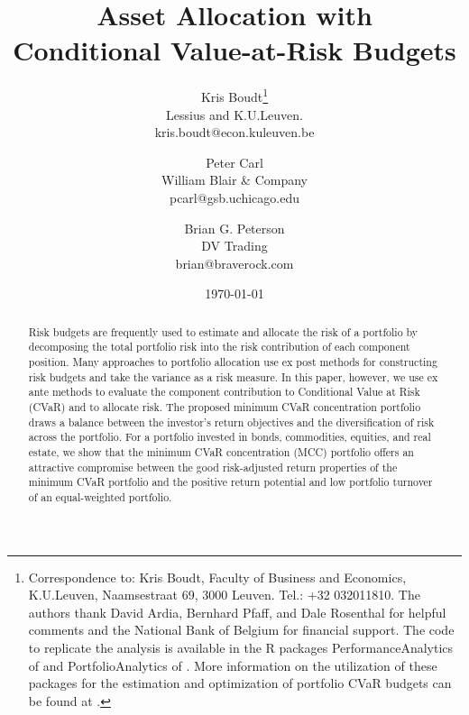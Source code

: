 \documentclass[12pt,a4paper]{article}
\renewcommand{\baselinestretch}{1.3}
\begin{document}
\vspace{-2cm}
\renewcommand{\baselinestretch}{1}
\title{Asset Allocation with \\ Conditional Value-at-Risk Budgets}

\smallskip

\author{
Kris Boudt\thanks{Correspondence to: Kris Boudt,
Faculty of Business and Economics, K.U.Leuven, Naamsestraat 69, 3000 Leuven. Tel.: +32 032011810. The authors thank David Ardia, Bernhard Pfaff, and Dale Rosenthal for helpful comments and the National Bank of Belgium for financial support. The code to replicate the analysis is available in the R packages PerformanceAnalytics of \citet{PerformanceAnalytics} and PortfolioAnalytics of \citet{PortfolioAnalytics}. More information on the utilization of these packages for the estimation and optimization of portfolio CVaR budgets can be found at \web.}\\
Lessius and K.U.Leuven.\\
kris.boudt@econ.kuleuven.be
 \and Peter Carl\\
William Blair \& Company  \\
pcarl@gsb.uchicago.edu\\
\and Brian G. Peterson\\
DV Trading\\
brian@braverock.com}

\date{\today}

\maketitle
\thispagestyle{empty} %

\vspace{-0.5cm}

\renewcommand{\baselinestretch}{1}
\begin{abstract}
Risk budgets are frequently used to estimate and allocate the risk of a portfolio by decomposing the total portfolio risk into the risk contribution of each component position. Many approaches to portfolio allocation use ex post methods for constructing risk budgets and take the variance as a risk measure. In this paper, however, we use ex ante methods to evaluate the component contribution to Conditional Value at Risk (CVaR) and to allocate risk. The proposed minimum CVaR concentration portfolio draws a balance between the investor's return objectives and the diversification of risk across the portfolio. For a portfolio invested in bonds, commodities, equities, and real estate, we show that the minimum CVaR concentration (MCC) portfolio offers an attractive compromise between the good risk-adjusted return properties of the minimum CVaR portfolio and the positive return potential and low portfolio turnover of an equal-weighted portfolio.
\end{abstract}
\end{document}
